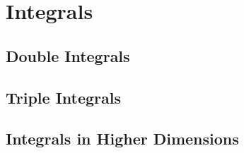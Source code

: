 \section{Integrals}

\subsection{Double Integrals}

\subsection{Triple Integrals}

\subsection{Integrals in Higher Dimensions}






\begin{comment}

-Multiple integrals:
-double integrals over:
 -axis-parallel rectangles (simplest case, limits are constants)
 -triangles with two points with same y-coordinate -> y(x) is a linear function
  -can also be done using x(y) - whatever is most convenient
 -general triangles (split into two triangles of the sort above)
 -general polygons (via triangulation)
 -segments of circular annulus -> uses a coordinate transformation to polar coordinates
  -generalization to arbitrary coordinates
-triple integrals over
 -axis parallel cuboids
 -3-simplex (tetrahedron)
 -general polyeders
 -using cyclindrical, spherical and general 3D coordinates
-nD integrals
 
-line integrals (of scalar function),
-line integrals of vector fields (circulation), surface integrals (flux)
-coordinate transformations (polar, cylindricial, spherical, etc. -> jacobian determinant)

\end{comment} 
